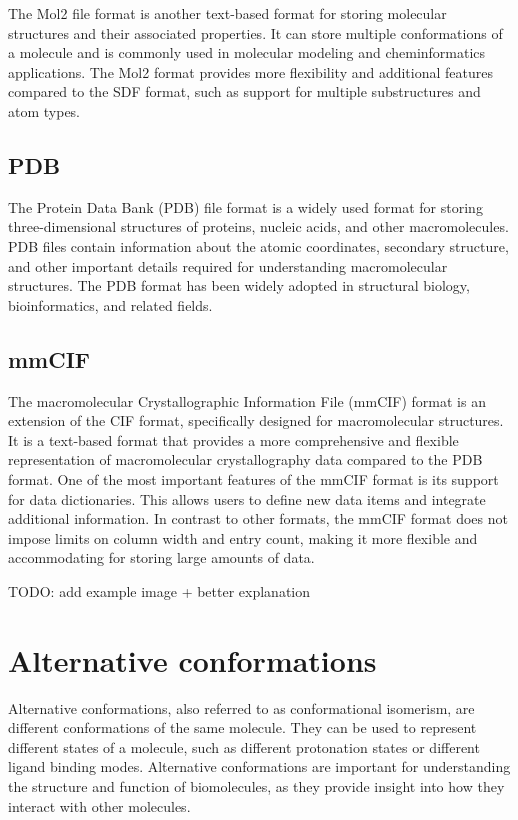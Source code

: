 \documentclass[
  digital,     %
  oneside,     %
  nosansbold,  %
  nocolorbold, %
  lof,         %
  lot,         %
]{fithesis4}
\begin{document}
The Mol2 file format is another text-based format for storing molecular structures and their associated properties. It can store multiple conformations of a molecule and is commonly used in molecular modeling and cheminformatics applications. The Mol2 format provides more flexibility and additional features compared to the SDF format, such as support for multiple substructures and atom types.

\subsection{PDB}
\label{subsection:pdb}

The Protein Data Bank (PDB) file format is a widely used format for storing three-dimensional structures of proteins, nucleic acids, and other macromolecules. PDB files contain information about the atomic coordinates, secondary structure, and other important details required for understanding macromolecular structures. The PDB format has been widely adopted in structural biology, bioinformatics, and related fields.

\subsection{mmCIF}
\label{subsection:mmcif}

The macromolecular Crystallographic Information File (mmCIF) format is an extension of the CIF format, specifically designed for macromolecular structures.
It is a text-based format that provides a more comprehensive and flexible representation of macromolecular crystallography data compared to the PDB format.
One of the most important features of the mmCIF format is its support for data dictionaries.
This allows users to define new data items and integrate additional information.
In contrast to other formats, the mmCIF format does not impose limits on column width and entry count, making it more flexible and accommodating for storing large amounts of data.

TODO: add example image + better explanation

\section{Alternative conformations}
\label{section:alternative_conformations}

Alternative conformations, also referred to as conformational isomerism, are different conformations of the same molecule. They can be used to represent different states of a molecule, such as different protonation states or different ligand binding modes. Alternative conformations are important for understanding the structure and function of biomolecules, as they provide insight into how they interact with other molecules.
\end{document}
